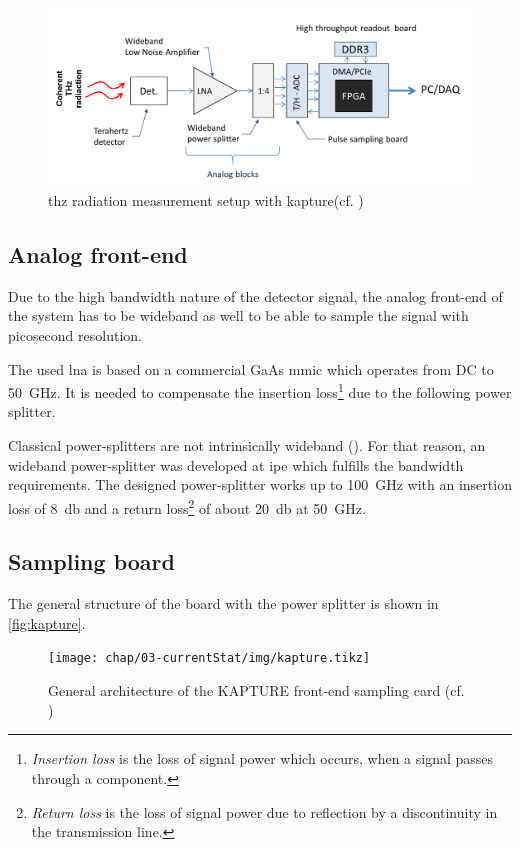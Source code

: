 \begin{figure}[tbh]
	\centering
	\includegraphics[width = \textwidth]{chap/03-currentStat/img/thz_chain}
	\caption[THz measurement with KAPTURE]{\gls{thz} radiation measurement setup with \gls{kapture}(cf. \cite{caselle2014})}
	\label{fig:thz_chain}
\end{figure}

\subsection{Analog front-end}
Due to the high bandwidth nature of the detector signal, the analog front-end of the system has to be wideband as well to be able to sample the signal with picosecond resolution. 

The used \gls{lna} is based on a commercial GaAs \gls{mmic} which operates from DC to \SI{50}{\giga \hertz}. It is needed to compensate the insertion loss\footnote{\textit{Insertion loss} is the loss of signal power which occurs, when a signal passes through a component.} due to the following power splitter. %

Classical power-splitters are not intrinsically wideband (\cite{caselle2014}). For that reason, an wideband power-splitter was developed at \gls{ipe} which fulfills the bandwidth requirements. The designed power-splitter works up to \SI{100}{\giga \hertz} with an insertion loss of \SI{8}{\decibel} and a return loss\footnote{\textit{Return loss} is the loss of signal power due to reflection by a discontinuity in the transmission line.} of about \SI{20}{\decibel} at \SI{50}{\giga \hertz}.\cite{caselle2014}

\subsection{Sampling board}
The general structure of the board with the power splitter is shown in \autoref{fig:kapture}. 
\begin{figure}[tbh]
	\centering
	\texttt{[image: chap/03-currentStat/img/kapture.tikz]}
	\caption{General architecture of the KAPTURE front-end sampling card (cf. \cite[p.2]{caselleKAP})}
	\label{fig:kapture}
\end{figure}

